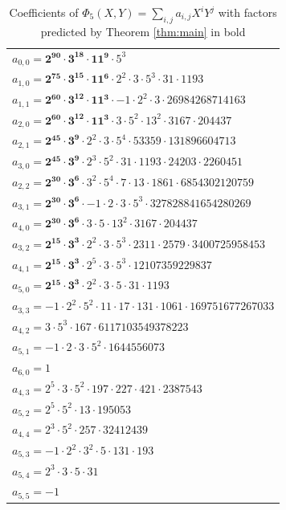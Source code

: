 \documentclass[11pt]{amsart}
\theoremstyle{definition}
\begin{document}
\begin{table}[h]
\begin{tabular}{l}
$a_{0, 0} = \mathbf{2^{90} \cdot 3^{18} \cdot 11^{9}} \cdot 5^{3}$  \\
$a_{1, 0} = \mathbf{2^{75} \cdot 3^{15} \cdot 11^{6}} \cdot 2^{2} \cdot 3 \cdot 5^{3} \cdot 31 \cdot 1193$  \\
$a_{1, 1} = \mathbf{2^{60} \cdot 3^{12} \cdot 11^{3}} \cdot -1 \cdot 2^{2} \cdot 3 \cdot 26984268714163$  \\
$a_{2, 0} = \mathbf{2^{60} \cdot 3^{12} \cdot 11^{3}} \cdot 3 \cdot 5^{2} \cdot 13^{2} \cdot 3167 \cdot 204437$  \\
$a_{2, 1} = \mathbf{2^{45} \cdot 3^{9}} \cdot 2^{2} \cdot 3 \cdot 5^{4} \cdot 53359 \cdot 131896604713$  \\
$a_{3, 0} = \mathbf{2^{45} \cdot 3^{9}} \cdot 2^{3} \cdot 5^{2} \cdot 31 \cdot 1193 \cdot 24203 \cdot 2260451$  \\
$a_{2, 2} = \mathbf{2^{30} \cdot 3^{6}} \cdot 3^{2} \cdot 5^{4} \cdot 7 \cdot 13 \cdot 1861 \cdot 6854302120759$  \\
$a_{3, 1} = \mathbf{2^{30} \cdot 3^{6}} \cdot -1 \cdot 2 \cdot 3 \cdot 5^{3} \cdot 327828841654280269$  \\
$a_{4, 0} = \mathbf{2^{30} \cdot 3^{6}} \cdot 3 \cdot 5 \cdot 13^{2} \cdot 3167 \cdot 204437$  \\
$a_{3, 2} = \mathbf{2^{15} \cdot 3^{3}} \cdot 2^{2} \cdot 3 \cdot 5^{3} \cdot 2311 \cdot 2579 \cdot 3400725958453$  \\
$a_{4, 1} = \mathbf{2^{15} \cdot 3^{3}} \cdot 2^{5} \cdot 3 \cdot 5^{3} \cdot 12107359229837$  \\
$a_{5, 0} = \mathbf{2^{15} \cdot 3^{3}} \cdot 2^{2} \cdot 3 \cdot 5 \cdot 31 \cdot 1193$  \\
$a_{3, 3} = -1 \cdot 2^{2} \cdot 5^{2} \cdot 11 \cdot 17 \cdot 131 \cdot 1061 \cdot 169751677267033$ \\
$a_{4, 2} = 3 \cdot 5^{3} \cdot 167 \cdot 6117103549378223$ \\
$a_{5, 1} = -1 \cdot 2 \cdot 3 \cdot 5^{2} \cdot 1644556073$ \\
$a_{6, 0} = 1$ \\
$a_{4, 3}  = 2^{5} \cdot 3 \cdot 5^{2} \cdot 197 \cdot 227 \cdot 421 \cdot 2387543$ \\
$a_{5, 2}  = 2^{5} \cdot 5^{2} \cdot 13 \cdot 195053$ \\
$a_{4, 4}  = 2^{3} \cdot 5^{2} \cdot 257 \cdot 32412439$ \\
$a_{5, 3}  = -1 \cdot 2^{2} \cdot 3^{2} \cdot 5 \cdot 131 \cdot 193$ \\
$a_{5, 4}  = 2^{3} \cdot 3 \cdot 5 \cdot 31$ \\
$a_{5, 5}  = -1$ \\
\end{tabular}
\caption{Coefficients of $\Phi_5(X,Y) = \sum_{i,j}a_{i,j}X^iY^j$ with factors predicted by Theorem \ref{thm:main} in bold}
\label{tab:Phi5}
\end{table}
\end{document}
